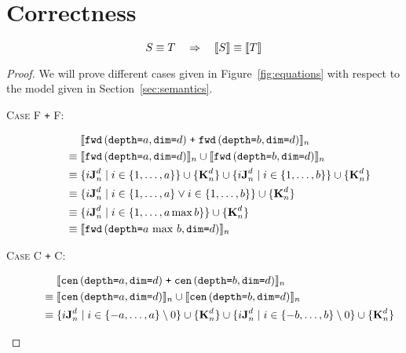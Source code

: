 \section{Correctness}


\begin{theorem}[Soundness]
\[
S \equiv T
\quad
\Rightarrow
\quad
\interp{S} \equiv \interp{T}
\]
\end{theorem}

\begin{proof}
We will prove different cases given in Figure~\ref{fig:equations} with respect
to the model given in Section~\ref{sec:semantics}.

\begin{description}
  \item[\textsc{Case F \texttt{+} F}:]
    \begin{align*}
      & \; \interp{\stenFwdS{a}{d} \; \texttt{+} \; \stenFwdS{b}{d}}_{n} \\
      \equiv & \; \interp{\stenFwdS{a}{d}}_{n} \cup \interp{\stenFwdS{b}{d}}_{n} \\
      \equiv & \; \{i\singleEntry{d}{n} \mid i \in \{1, \ldots, a\} \} \cup
                  \{\zeroEntry{d}{n}\} \cup
                  \{i\singleEntry{d}{n} \mid i \in \{1, \ldots, b\} \} \cup
                  \{\zeroEntry{d}{n}\} \\
      \equiv & \; \{i\singleEntry{d}{n} \mid i \in \{1, \ldots, a\} \vee
                                             i \in \{1, \ldots, b\} \} \cup
                  \{\zeroEntry{d}{n}\} \\
      \equiv & \; \{i\singleEntry{d}{n} \mid i \in \{1, \ldots, a \max b\} \} \cup 
                  \{\zeroEntry{d}{n}\}\\
      \equiv & \; \interp{\stenFwdS{a \, \max \, b}{d}}_n \\
    \end{align*}
  \item[\textsc{Case C \texttt{+} C}:]
    \begin{align*}
      & \; \interp{\stenCenS{a}{d} \; \texttt{+} \; \stenCenS{b}{d}}_{n} \\
      \equiv & \; \interp{\stenCenS{a}{d}}_{n} \cup \interp{\stenCenS{b}{d}}_{n} \\
      \equiv & \; \{i\singleEntry{d}{n} \mid i \in \{-a, \ldots, a\} \setminus 0 \} \cup
                  \{\zeroEntry{d}{n}\} \cup
                  \{i\singleEntry{d}{n} \mid i \in \{-b, \ldots, b\} \setminus 0 \} \cup
                  \{\zeroEntry{d}{n}\} \\

\end{align*}
\end{description}
\end{proof}
